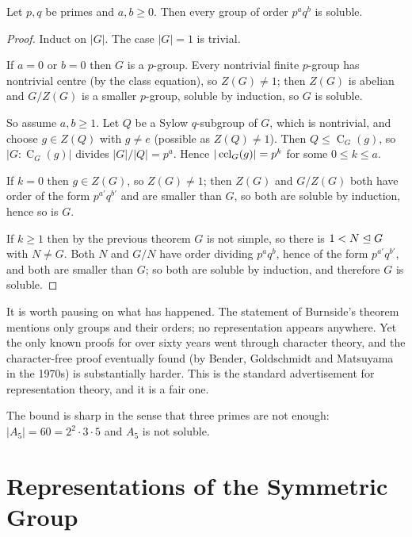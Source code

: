 \documentclass[a4paper]{scrartcl}
\newcommand{\Cent}{\operatorname{C}}
\begin{document}
\begin{theorem}[Burnside, 1904]
	Let $p, q$ be primes and $a, b\geq0$. Then every group of order $p^aq^b$ is soluble.
\end{theorem}
\begin{proof}
	Induct on $|G|$. The case $|G| = 1$ is trivial.

	If $a = 0$ or $b = 0$ then $G$ is a $p$-group. Every nontrivial finite $p$-group has nontrivial centre (by the class equation), so $Z(G)\neq1$; then $Z(G)$ is abelian and $G/Z(G)$ is a smaller $p$-group, soluble by induction, so $G$ is soluble.

	So assume $a, b\geq 1$. Let $Q$ be a Sylow $q$-subgroup of $G$, which is nontrivial, and choose $g\in Z(Q)$ with $g\neq e$ (possible as $Z(Q)\neq1$). Then $Q\leq\Cent_G(g)$, so $|G:\Cent_G(g)|$ divides $|G|/|Q| = p^a$. Hence $|\operatorname{ccl}_G(g)| = p^k$ for some $0\leq k\leq a$.

	If $k = 0$ then $g\in Z(G)$, so $Z(G)\neq1$; then $Z(G)$ and $G/Z(G)$ both have order of the form $p^{a'}q^{b'}$ and are smaller than $G$, so both are soluble by induction, hence so is $G$.

	If $k\geq1$ then by the previous theorem $G$ is not simple, so there is $1 < N\trianglelefteq G$ with $N\neq G$. Both $N$ and $G/N$ have order dividing $p^aq^b$, hence of the form $p^{a'}q^{b'}$, and both are smaller than $G$; so both are soluble by induction, and therefore $G$ is soluble.
\end{proof}

\begin{remark}
	It is worth pausing on what has happened. The statement of Burnside's theorem mentions only groups and their orders; no representation appears anywhere. Yet the only known proofs for over sixty years went through character theory, and the character-free proof eventually found (by Bender, Goldschmidt and Matsuyama in the 1970s) is substantially harder. This is the standard advertisement for representation theory, and it is a fair one.
\end{remark}

\begin{remark}
	The bound is sharp in the sense that three primes are not enough: $|A_5| = 60 = 2^2\cdot3\cdot5$ and $A_5$ is not soluble.
\end{remark}

\section{Representations of the Symmetric Group}
\end{document}
